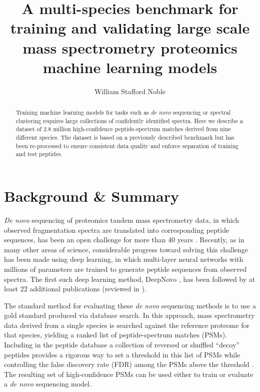 \documentclass{article}
\title{A multi-species benchmark for training and validating large scale mass spectrometry proteomics machine learning models}
\author[1,2]{William Stafford Noble}
\affil[1]{Department of Genome Sciences, University of Washington}
\affil[2]{Paul G.\ Allen School of Computer Science and Engineering, University of Washington}
\date{}
\begin{document}
\maketitle


\begin{abstract}
  Training machine learning models for tasks such as \textit{de novo} sequencing or spectral clustering requires large collections of confidently identified spectra.
  Here we describe a dataset of 2.8 million high-confidence peptide-spectrum matches derived from nine different species.
  The dataset is based on a previously described benchmark but has been re-processed to ensure consistent data quality and enforce separation of training and test peptides.
\end{abstract}

\section*{Background \& Summary}

\textit{De novo} sequencing of proteomics tandem mass spectrometry data, in which observed fragmentation spectra are translated into corresponding peptide sequences, has been an open challenge for more than 40 years \cite{sakurai1984paas}.
Recently, as in many other areas of science, considerable progress toward solving this challenge has been made using deep learning, in which multi-layer neural networks with millions of parameters are trained to generate peptide sequences from observed spectra.
The first such deep learning method, DeepNovo \cite{tran2017denovo}, has been followed by at least 22 additional publications (reviewed in \cite{bittremieux2024deep}).

The standard method for evaluating these \textit{de novo} sequencing methods is to use a gold standard produced via database search.
In this approach, mass spectrometry data derived from a single species is searched against the reference proteome for that species, yielding a ranked list of peptide-spectrum matches (PSMs).
Including in the peptide database a collection of reversed or shuffled ``decoy'' peptides provides a rigorous way to set a threshold in this list of PSMs while controlling the false discovery rate (FDR) among the PSMs above the threshold \cite{elias2007target}.
The resulting set of high-confidence PSMs can be used either to train or evaluate a \textit{de novo} sequencing model.
\end{document}
